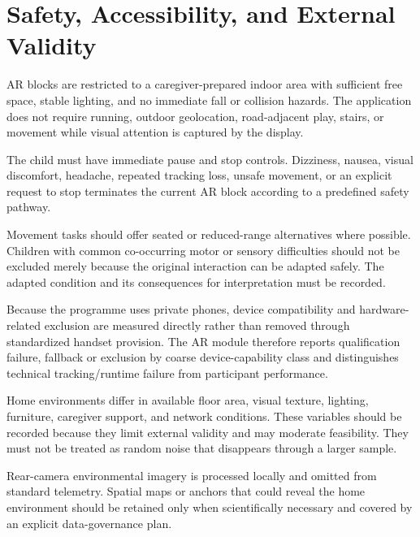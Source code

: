 \section{Safety, Accessibility, and External Validity}

AR blocks are restricted to a caregiver-prepared indoor area with sufficient free space, stable lighting, and no immediate fall or collision hazards. The application does not require running, outdoor geolocation, road-adjacent play, stairs, or movement while visual attention is captured by the display.

The child must have immediate pause and stop controls. Dizziness, nausea, visual discomfort, headache, repeated tracking loss, unsafe movement, or an explicit request to stop terminates the current AR block according to a predefined safety pathway.

Movement tasks should offer seated or reduced-range alternatives where possible. Children with common co-occurring motor or sensory difficulties should not be excluded merely because the original interaction can be adapted safely. The adapted condition and its consequences for interpretation must be recorded.

Because the programme uses private phones, device compatibility and hardware-related exclusion are measured directly rather than removed through standardized handset provision. The AR module therefore reports qualification failure, fallback or exclusion by coarse device-capability class and distinguishes technical tracking/runtime failure from participant performance.

Home environments differ in available floor area, visual texture, lighting, furniture, caregiver support, and network conditions. These variables should be recorded because they limit external validity and may moderate feasibility. They must not be treated as random noise that disappears through a larger sample.

Rear-camera environmental imagery is processed locally and omitted from standard telemetry. Spatial maps or anchors that could reveal the home environment should be retained only when scientifically necessary and covered by an explicit data-governance plan.
